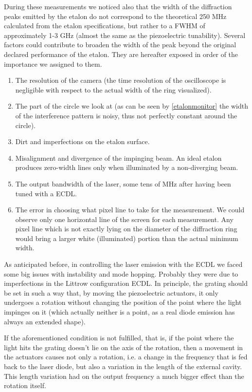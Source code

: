 \medskip
During these measurements we noticed also that the width of the diffraction peaks emitted by the etalon do not correspond to the theoretical 250 MHz calculated from the etalon specifications, but rather to a FWHM of approximately 1-3 GHz (almost the same as the piezoelectric tunability). Several factors could contribute to broaden the width of the peak beyond the original declared performance of the etalon. They are hereafter exposed in order of the importance we assigned to them.
\begin{enumerate}
\item The resolution of the camera (the time resolution of the oscilloscope is negligible with respect to the actual width of the ring visualized).
\item The part of the circle we look at (as can be seen by \cref{etalonmonitor} the width of the interference pattern is noisy, thus not perfectly constant around the circle).
\item Dirt and imperfections on the etalon surface.
\item Misalignment and divergence of the impinging beam. An ideal etalon produces zero-width lines only when illuminated by a non-diverging beam.
\item The output bandwidth of the laser, some tens of MHz after having been tuned with a ECDL.
\item The error in choosing what pixel line to take for the measurement. We could observe only one horizontal line of the screen for each measurement. Any pixel line which is not exactly lying on the diameter of the diffraction ring would bring a larger white (illuminated) portion than the actual minimum width.
\end{enumerate}
As anticipated before, in controlling the laser emission with the ECDL we faced some big issues with instability and mode hopping. Probably they were due to imperfections in the Littrow configuration ECDL. In principle, the grating should be set in such a way that, by moving the piezoelectric actuators, it only undergoes a rotation without changing the position of the point where the light impinges on it (which actually neither is a point, as a real diode emission has always an extended shape).

If the aforementioned condition is not fulfilled, that is, if the point where the light hits the grating doesn't lie on the axis of the rotation, then a movement in the actuators causes not only a rotation, i.e. a change in the frequency that is fed back to the laser diode, but also a variation in the length of the external cavity. This length variation had on the output frequency a much bigger effect than the rotation itself.